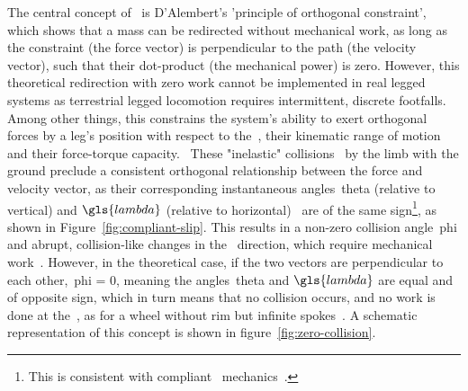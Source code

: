         The central concept of~ is D'Alembert's 'principle of orthogonal constraint', which shows that a mass can be redirected without mechanical work, as long as the constraint (\ie the force vector) is perpendicular to the path (\ie the velocity vector), such that their dot-product (\ie the mechanical power) is zero. However, this theoretical redirection with zero work cannot be implemented in real legged systems as terrestrial legged locomotion requires intermittent, discrete footfalls. Among other things, this constrains the system's ability to exert orthogonal forces by a leg's position with respect to the~, their kinematic range of motion and their force-torque capacity.~\cite{Lee2018} These "inelastic" collisions~\cite{Kuo2005} by the limb with the ground preclude a consistent orthogonal relationship between the force and velocity vector, as their corresponding instantaneous angles~\gls{theta} (relative to vertical) and$~\gls{lambda}$ (relative to horizontal)~\cite{Lee2013} are of the same sign\footnote{This is consistent with compliant~ mechanics~\cite{Lee2013}.}, as shown in Figure~\ref{fig:compliant-slip}. This results in a non-zero collision angle~\gls{phi} and abrupt, collision-like changes in the~ direction, which require mechanical work~\cite{Lee2011}. However, in the theoretical case, if the two vectors are perpendicular to each other,~\gls{phi} = 0, meaning the angles~\gls{theta} and$~\gls{lambda}$ are equal and of opposite sign, which in turn means that no collision occurs, and no work is done at the~, as for a wheel without rim but infinite spokes~\cite{Biewener2018}. A schematic representation of this concept is shown in figure~\ref{fig:zero-collision}. 
        

